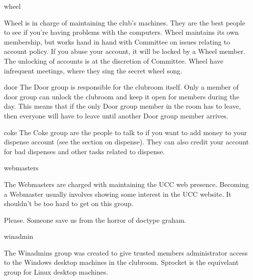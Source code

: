 \begin{uccgroup}{wheel}

Wheel is in charge of maintaining the club's machines. They are the best people to see if you're having problems with the computers. Wheel maintains its own membership, but works hand in hand with Committee on issues relating to account policy. If you abuse your account, it will be locked by a Wheel member. The unlocking of accounts is at the discretion of Committee. Wheel have infrequent meetings, where they sing the secret wheel song. %

\end{uccgroup}
\pagebreak
\begin{uccgroup}{door}
The Door group is responsible for the clubroom itself. Only a member of door group can unlock the clubroom and keep it open for members during the day. This means that if the only Door group member in the room has to leave, then everyone will have to leave until another Door group member arrives.
\end{uccgroup}

\begin{uccgroup}{coke}
The Coke group are the people to talk to if you want to add money to your dispense account (see the section on dispense). They can also credit your account for bad dispenses and other tasks related to dispense.
\end{uccgroup}

\begin{uccgroup}{webmasters}

The Webmasters are charged with maintaining the UCC web presence. Becoming a Webmaster usually involves showing some interest in the UCC website. It shouldn't be too hard to get on this group.

 Please. Someone save us from the horror of doctype graham.
\end{uccgroup}

\begin{uccgroup}{winadmin}

The Winadmins group was created to give trusted members administrator access to the Windows desktop machines in the clubroom. Sprocket is the equivelant group for Linux desktop machines.
\end{uccgroup}






